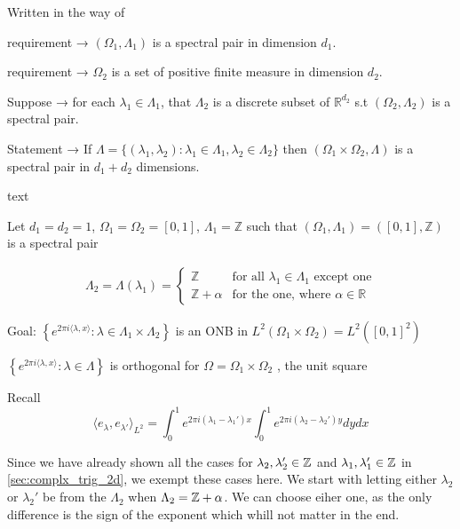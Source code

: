 \documentclass[../thesis.tex]{subfiles}
\begin{document}
Written in the way of \cite{jorgensenSpectralPairsCartesian2001}

\begin{theorem}
    requirement → $(\Omega_1,\Lambda_1)$ is a spectral pair in dimension $d_1$.

    requirement →  $\Omega_2$ is a set of positive finite measure in dimension $d_2$.

    Suppose →  for each $\lambda_1 \in \Lambda_1$, that $\Lambda_2$ is a discrete subset of $\mathbb{R}^{d_2}$ s.t $(\Omega_2,\Lambda_2)$ is a spectral pair.

    Statement → If $\Lambda=\{(\lambda_1,\lambda_2): \lambda_1\in \Lambda_1, \lambda_2 \in \Lambda_2\}$ then $(\Omega_1\times\Omega_2, \Lambda)$ is a spectral pair in $d_1+d_2$ dimensions. 
\end{theorem}



\begin{example}
    text\\
\end{example}


Let $d_1=d_2=1$,  $\Omega_1 = \Omega_2=[0,1]$, $\Lambda_1 = \mathbb{Z}$ such that $(\Omega_1,\Lambda_1)=([0,1],\mathbb{Z})$ is a spectral pair


\begin{align*}
    \Lambda_2=\Lambda(\lambda_1) = \begin{cases}        
        \mathbb{Z} & \text{for all } \lambda_1 \in \Lambda_1 \text{ except one}\\        
        \mathbb{Z}+\alpha & \text{for the one, where } \alpha \in \mathbb{R}   
    \end{cases}
\end{align*}


Goal: $\left\{ e^{2\pi i \langle \lambda,x  \rangle } : \lambda \in \Lambda_1\times\Lambda_2\right\}$ is an ONB in $L^2(\Omega_1\times\Omega_2)= L^2{([0,1]^2)}$


$\left\{ e^{2\pi i \langle \lambda,x  \rangle } : \lambda \in \Lambda\right\}$ is orthogonal for $\Omega = \Omega_1 \times \Omega_2$ , the unit square

Recall 
\begin{equation*}
    \langle e_\lambda,e_{\lambda'} \rangle_{L^2} = \int_0^1e^{2\pi i  (\lambda_1- \lambda_1')x}\int_0^1  e^{2\pi i  (\lambda_2 - \lambda_2')y} dy dx
\end{equation*}

Since we have already shown all the cases for $\lambda_2,\lambda_2' \in \mathbb{Z}$ and $\lambda_1,\lambda_1' \in \mathbb{Z}$ in \cref{sec:complx_trig_2d}, we exempt these cases here. We start with letting either $\lambda_2$ or $\lambda_2'$ be from the $\Lambda_2$ when $\Lambda_2=\mathbb{Z}+\alpha$. We can choose eiher one, as the only difference is the sign of the exponent which whill not matter in the end.
\end{document}

